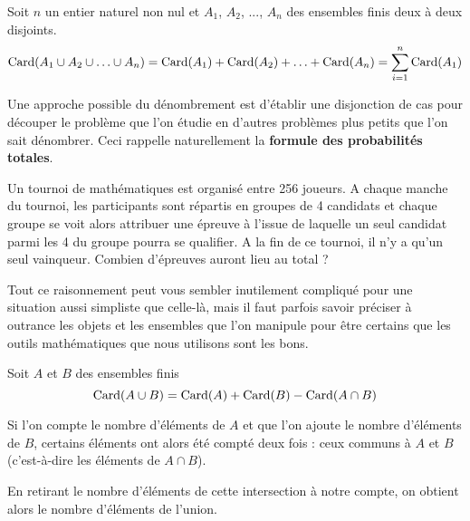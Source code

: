 \documentclass[11pt,fleqn, openany]{book} %
\begin{document}
\begin{proposition} Soit $n$ un entier naturel non nul et $A_1$, $A_2$, ..., $A_n$ des ensembles finis deux à deux disjoints.
\[ \mathrm{Card}(A_1 \cup A_2 \cup \ldots  \cup A_n)= \mathrm{Card}(A_1) + \mathrm{Card}(A_2)+\ldots + \mathrm{Card}(A_n)= \sum_{i=1}^n \mathrm{Card}(A_1)\]
\vspace{-0.5cm}\end{proposition}

Une approche possible du dénombrement est d'établir une disjonction de cas pour découper le problème que l'on étudie en d'autres problèmes plus petits que l'on sait dénombrer. Ceci rappelle naturellement la \textbf{formule des probabilités totales}.

\begin{example}Un tournoi de mathématiques est organisé entre 256 joueurs. A chaque manche du tournoi, les participants sont répartis en groupes de 4 candidats et chaque groupe se voit alors attribuer une épreuve à l'issue de laquelle un seul candidat parmi les 4 du groupe pourra se qualifier. A la fin de ce tournoi, il n'y a qu'un seul vainqueur. Combien d'épreuves auront lieu au total ?

\vskip150pt

\end{example}
Tout ce raisonnement peut vous sembler inutilement compliqué pour une situation aussi simpliste que celle-là, mais il faut parfois savoir préciser à outrance les objets et les ensembles que l'on manipule pour être certains que les outils mathématiques que nous utilisons sont les bons.

\begin{proposition}
Soit $A$ et $B$ des ensembles finis
\[ \mathrm{Card}(A \cup B) = \mathrm{Card}(A) + \mathrm{Card}(B) - \mathrm{Card}( A\cap B)\]\vspace{-0.5cm}\end{proposition}
\begin{minipage}{0.65\linewidth}
Si l'on compte le nombre d'éléments de $A$ et que l'on ajoute le nombre d'éléments de $B$, certains éléments ont alors été compté deux fois : ceux communs à $A$ et $B$ (c'est-à-dire les éléments de $A\cap B$).

En retirant le nombre d'éléments de cette intersection à notre compte, on obtient alors le nombre d'éléments de l'union.
\end{minipage}\hfill\begin{minipage}{0.3\linewidth}
\newcommand{\A}{(0,0) ++(135:2) circle (2)}
\newcommand{\B}{(0,0) ++(45:2) circle (2)}
\end{minipage}
\end{document}
